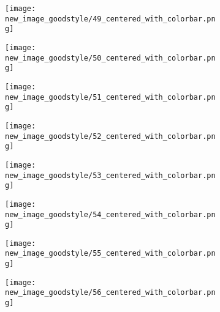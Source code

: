 \documentclass[a4paper,12pt]{article}
\begin{document}
\begin{figure}[H]
  \begin{subfigure}{0.11\textwidth}
    \texttt{[image: new\_image\_goodstyle/49\_centered\_with\_colorbar.png]}
  \end{subfigure}
  \hfill
  \begin{subfigure}{0.11\textwidth}
    \texttt{[image: new\_image\_goodstyle/50\_centered\_with\_colorbar.png]}
  \end{subfigure}
  \hfill
  \begin{subfigure}{0.11\textwidth}
    \texttt{[image: new\_image\_goodstyle/51\_centered\_with\_colorbar.png]}
  \end{subfigure}
  \hfill
  \begin{subfigure}{0.11\textwidth}
    \texttt{[image: new\_image\_goodstyle/52\_centered\_with\_colorbar.png]}
  \end{subfigure}
  \hfill
  \begin{subfigure}{0.11\textwidth}
    \texttt{[image: new\_image\_goodstyle/53\_centered\_with\_colorbar.png]}
  \end{subfigure}
  \hfill
  \begin{subfigure}{0.11\textwidth}
    \texttt{[image: new\_image\_goodstyle/54\_centered\_with\_colorbar.png]}
  \end{subfigure}
  \hfill
  \begin{subfigure}{0.11\textwidth}
    \texttt{[image: new\_image\_goodstyle/55\_centered\_with\_colorbar.png]}
  \end{subfigure}
  \hfill
  \begin{subfigure}{0.11\textwidth}
    \texttt{[image: new\_image\_goodstyle/56\_centered\_with\_colorbar.png]}
  \end{subfigure}
  \hfill
\end{figure}
\end{document}
